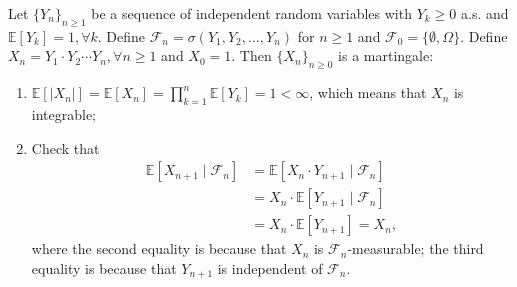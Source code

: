 \begin{example}
Let $\{Y_n\}_{n\ge1}$ be a sequence of independent random variables with 
$Y_k\ge0$ a.s. and $\mathbb{E}[Y_k]=1, \forall k$.
Define $\mathcal{F}_n = \sigma(Y_1,Y_2,\ldots,Y_n)$ for $n\ge1$ and $\mathcal{F}_0=\{\emptyset,\Omega\}$.
Define $X_n = Y_1\cdot Y_2\cdots Y_n,\forall n\ge1$ and $X_0=1$.
Then $\{X_n\}_{n\ge0}$ is a martingale:
\begin{enumerate}
\item
$\mathbb{E}[|X_n|]=\mathbb{E}[X_n]=\prod_{k=1}^n\mathbb{E}[Y_k]=1<\infty$, which means that $X_n$ is integrable;
\item
Check that
\begin{align*}
\mathbb{E}[X_{n+1}\mid\mathcal{F}_n]&=\mathbb{E}[X_n\cdot Y_{n+1}\mid\mathcal{F}_n]\\
&=X_n\cdot \mathbb{E}[Y_{n+1}\mid\mathcal{F}_n]\\
&=X_n\cdot \mathbb{E}[Y_{n+1}]=X_n,
\end{align*}
where the second equality is because that $X_n$ is $\mathcal{F}_n$-measurable;
the third equality is because that $Y_{n+1}$ is independent of $\mathcal{F}_n$.
\end{enumerate}
\end{example}

















